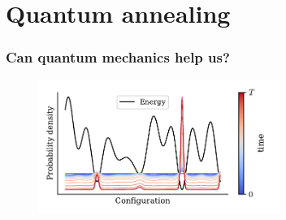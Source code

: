 \documentclass[11pt]{beamer}
\begin{document}
\section{Quantum annealing}

\begin{frame}
    \frametitle{Can quantum mechanics help us?}
    \begin{figure}[!htb]
        \centering
        \includegraphics[width=0.7\textwidth]{../plots/QA.pdf}
        \label{fig:ising_gap}
    \end{figure}
\end{frame}
\end{document}
